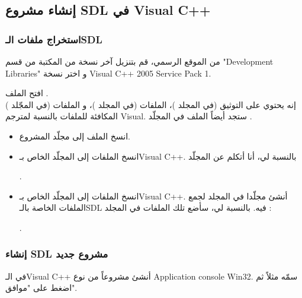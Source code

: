 \subsection{إنشاء مشروع \textenglish{SDL} في \textenglish{Visual C++}}

\subsubsection{استخراج ملفات الـ\textenglish{SDL}}

من الموقع الرسمي، قم بتنزيل آخر نسخة من المكتبة من قسم
"\textenglish{Development Libraries}"
و اختر نسخة
\textenglish{Visual C++ 2005 Service Pack 1}.

افتح الملف
.\\
إنه يحتوي  على التوثيق (في المجلد
)،
 الملفات
(في المجلد
)، 
و الملفات
(في المجّلد
)
المكافئة للملفات
بالنسبة لمترجم
\textenglish{Visual}.
ستجد أيضاً الملف 
في المجلّد
.

\begin{itemize}
	\item انسخ الملف
	إلى مجلّد المشروع.
	\item انسخ الملفات
	إلى المجلّد 
	الخاص بـ\textenglish{Visual C++}.
	بالنسبة لي، أنا أتكلم عن المجلّد
	
	.
	
	\item انسخ الملفات
	إلى المجلّد
	الخاص بـ\textenglish{Visual C++}.
	أنشئ مجلّدا
	في المجلد
	لجمع الملفات
	الخاصة بالـ\textenglish{SDL}
	فيه. بالنسبة لي، سأضع تلك الملفات في المجلد :
	
	.

\end{itemize}

\subsubsection{إنشاء \textenglish{SDL} مشروع جديد}

في الـ\textenglish{Visual C++}
أنشئ مشروعاً من نوع 
\textenglish{Application console Win32}.
سمّه مثلاً
ثم اضغط على "موافق".

